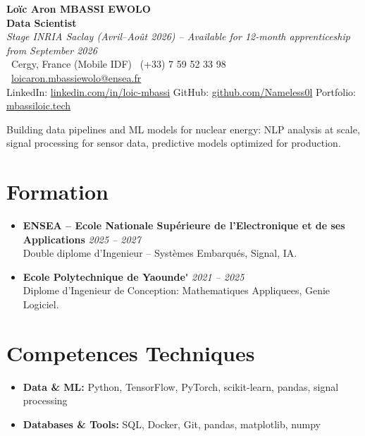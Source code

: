 \documentclass[a4paper,11pt]{article}
\begin{document}
\begin{center}
    {\Large \textbf{Lo\"ic Aron MBASSI EWOLO}} \\ \vspace{4pt}
    \textbf{\large Data Scientist} \\
    \textit{\small Stage INRIA Saclay (Avril--Ao\^ut 2026) -- Available for 12-month apprenticeship from September 2026} \\ \vspace{4pt}
    \small
    \Pointinghand\ Cergy, France (Mobile IDF) \quad
    \Mobilefone\ (+33) 7 59 52 33 98 \quad
    {\color{primary}\Letter\ \href{mailto:loicaron.mbassiewolo@ensea.fr}{loicaron.mbassiewolo@ensea.fr}} \\ \vspace{2pt}
    {\color{primary}LinkedIn: \href{https://www.linkedin.com/in/loic-mbassi/}{linkedin.com/in/loic-mbassi}} \quad
    {\color{primary}GitHub: \href{https://github.com/Nameless0l}{github.com/Nameless0l}} \quad
    {\color{primary}Portfolio: \href{https://mbassiloic.tech}{mbassiloic.tech}}
\end{center}

\vspace{-6pt}

\noindent\small{Building data pipelines and ML models for nuclear energy: NLP analysis at scale, signal processing for sensor data, predictive models optimized for production.}

\section{Formation}
\begin{itemize}[leftmargin=*, label=\tiny$\bullet$, nosep]
    \item \textbf{ENSEA -- Ecole Nationale Sup\'erieure de l'Electronique et de ses Applications} \hfill \textit{2025 -- 2027} \\
    \small{Double diplome d'Ingenieur -- Syst\`emes Embarqu\'es, Signal, IA.}
    \item \textbf{Ecole Polytechnique de Yaounde\'} \hfill \textit{2021 -- 2025} \\
    \small{Diplome d'Ingenieur de Conception: Mathematiques Appliquees, Genie Logiciel.}
\end{itemize}

\section{Competences Techniques}
\begin{itemize}[leftmargin=*, nosep]
    \item \small{\textbf{Data \& ML:} Python, TensorFlow, PyTorch, scikit-learn, pandas, signal processing}
    \item \small{\textbf{Databases \& Tools:} SQL, Docker, Git, pandas, matplotlib, numpy}
\end{itemize}
\end{document}
